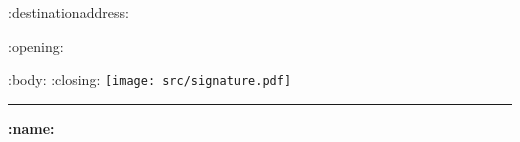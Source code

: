 \documentclass[ fontsize=12pt, parskip=full, paper=A4, fromalign=right, fromphone=false, fromemail=false, version=last,]{scrlttr2}
\begin{document}

\begin{letter}{:destinationaddress:}
\opening{:opening:}
:body:
:closing:
\vspace*{0.4cm} \newline
\texttt{[image: src/signature.pdf]}
\newline
\rule{29mm}{0.2mm} \newline
\textbf{:name:}
\end{letter}
\end{document}
